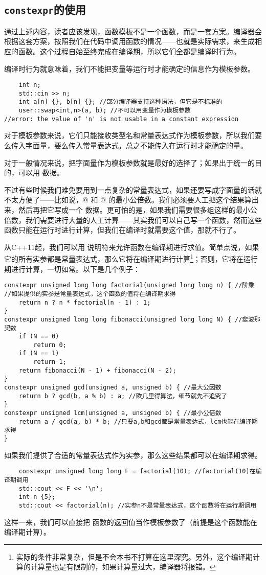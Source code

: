 \subsection*{\texttt{constexpr}的使用}
通过上述内容，读者应该发现，函数模板不是一个函数，而是一套方案。编译器会根据这套方案，按照我们在代码中调用函数的情况——也就是实际需求，来生成相应的函数。这个过程自始至终完成在编译期，所以它们全都是编译时行为。\par
编译时行为就意味着，我们不能把变量等运行时才能确定的信息作为模板参数。
\begin{lstlisting}
    int n;
    std::cin >> n;
    int a[n] {}, b[n] {}; //部分编译器支持这种语法，但它是不标准的
    user::swap<int,n>(a, b); //不可以用变量作为模板参数
//error: the value of 'n' is not usable in a constant expression
\end{lstlisting}
对于模板参数来说，它们只能接收类型名和常量表达式作为模板参数，所以我们要么传入字面量，要么传入常量表达式，总之不能传入在运行时才能确定的量。\par
对于一般情况来说，把字面量作为模板参数就是最好的选择了；如果出于统一的目的，可以用 \lstinline@constexpr@ 数据。\par
不过有些时候我们难免要用到一点复杂的常量表达式，如果还要写成字面量的话就不太方便了——比如说，@ 和 @ 的最小公倍数。我们必须要人工把这个结果算出来，然后再把它写成一个 \lstinline@constexpr@ 数据。更可怕的是，如果我们需要很多组这样的最小公倍数，我们需要进行大量的人工计算——其实我们可以自己写一个函数，然而这些函数只能在运行时进行计算，但我们在编译时就需要这个值，那就不行了。\par
从C++11起，我们可以用 \lstinline@constexpr@ 说明符来允许函数在编译期进行求值。简单点说，如果它的所有实参都是常量表达式，那么它将在编译期进行计算\footnote{实际的条件非常复杂，但是不会本书不打算在这里深究。另外，这个编译期计算的计算量也是有限制的，如果计算量过大，编译器将报错。}；否则，它将在运行期进行计算，一切如常。以下是几个例子：\pagebreak
\begin{lstlisting}
constexpr unsigned long long factorial(unsigned long long n) { //阶乘
//如果提供的实参是常量表达式，这个函数的值将在编译期求得
    return n ? n * factorial(n - 1) : 1;
}
constexpr unsigned long long fibonacci(unsigned long long N) { //斐波那契数
    if (N == 0)
        return 0;
    if (N == 1)
        return 1;
    return fibonacci(N - 1) + fibonacci(N - 2);
}
constexpr unsigned gcd(unsigned a, unsigned b) { //最大公因数
    return b ? gcd(b, a % b) : a; //欧几里得算法，细节就先不追究了
}
constexpr unsigned lcm(unsigned a, unsigned b) { //最小公倍数
    return a / gcd(a, b) * b; //只要a,b和gcd都是常量表达式，lcm也能在编译期求得
}
\end{lstlisting}
如果我们提供了合适的常量表达式作为实参，那么这些结果都可以在编译期求得。
\begin{lstlisting}
    constexpr unsigned long long F = factorial(10); //factorial(10)在编译期调用
    std::cout << F << '\n';
    int n {5};
    std::cout << factorial(n); //实参n不是常量表达式，这个函数将在运行期调用
\end{lstlisting}\par
这样一来，我们可以直接把 \lstinline@constexpr@ 函数的返回值当作模板参数了（前提是这个函数能在编译期计算）。\par
